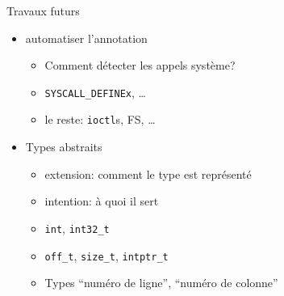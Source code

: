 \begin{frame}{Travaux futurs}
    \begin{itemize}
        \item automatiser l'annotation
            \begin{itemize}
                \item Comment détecter les appels système?
                \item \texttt{SYSCALL\_DEFINEx}, …
                \item le reste: \texttt{ioctl}s, FS, …
            \end{itemize}
        \item Types abstraits
            \begin{itemize}
                \item extension: comment le type est représenté
                \item intention: à quoi il sert
                \item \texttt{int}, \texttt{int32\_t}
                \item \texttt{off\_t}, \texttt{size\_t}, \texttt{intptr\_t}
                \item Types \enquote{numéro de ligne}, \enquote{numéro de colonne}
            \end{itemize}
        \end{itemize}
\end{frame}
